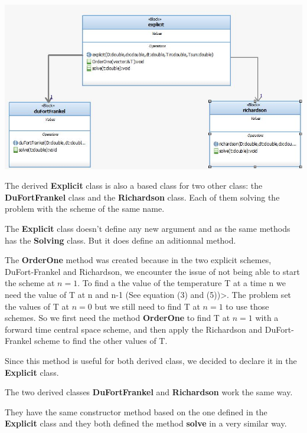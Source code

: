 \documentclass [10 pt, a4 paper]{article}
\begin{document}
\begin{center}
    \includegraphics[scale=0.6]{Chart/Explicit.JPG}
\end{center}

The derived \textbf{Explicit} class is also a based class for two other class: the \textbf{DuFortFrankel}
class and the \textbf{Richardson} class. Each of them solving the problem with the scheme of the same name.

\vspace{0.3cm}

The \textbf{Explicit} class doesn't define any new argument and as the same methods has the \textbf{Solving}
class. But it does define an aditionnal method. 

The \textbf{OrderOne} method was created because in the two explicit schemes, DuFort-Frankel
and Richardson, we encounter the issue of not being able to start the scheme at $n = 1$.
To find a the value of the temperature T at a time n we need the value of T at n and n-1 (See equation (3) and (5))>.
The problem set the values of T at $n = 0$ but we still need to find T at $n=1$ to use those
schemes. So we first need the method \textbf{OrderOne} to find T at $n = 1$ with a forward time central
space scheme, and then apply the Richardson and DuFort-Frankel scheme to find the other values 
of T.

Since this method is useful for both derived class, we decided to declare it in the 
\textbf{Explicit} class.

\vspace{0.3cm}

The two derived classes \textbf{DuFortFrankel} and \textbf{Richardson} work the same way.

They have the same constructor method based on the one defined in the \textbf{Explicit} class
and they both defined the method \textbf{solve} in a very similar way. 
\end{document}
